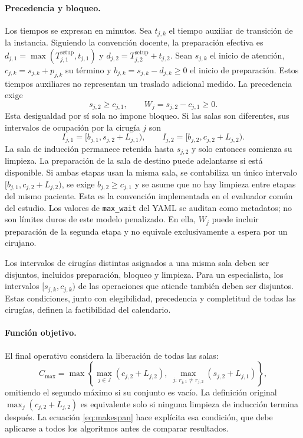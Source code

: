 \documentclass[11pt,a4paper]{article}
\newcommand{\Cmax}{C_{\max}}
\begin{document}
\paragraph{Precedencia y bloqueo.}
Los tiempos se expresan en minutos. Sea $t_{j,k}$ el tiempo auxiliar de transición de la instancia. Siguiendo la convención docente, la preparación efectiva es $d_{j,1}=\max(T^{\mathrm{setup}}_{j,1},t_{j,1})$ y $d_{j,2}=T^{\mathrm{setup}}_{j,2}+t_{j,2}$. Sean $s_{j,k}$ el inicio de atención, $c_{j,k}=s_{j,k}+p_{j,k}$ su término y $b_{j,k}=s_{j,k}-d_{j,k}\geq0$ el inicio de preparación. Estos tiempos auxiliares no representan un traslado adicional medido. La precedencia exige
\begin{equation}
s_{j,2}\geq c_{j,1},\qquad W_j=s_{j,2}-c_{j,1}\geq0.
\label{eq:precedencia}
\end{equation}
Esta desigualdad por sí sola no impone bloqueo. Si las salas son diferentes, sus intervalos de ocupación por la cirugía $j$ son
\begin{equation}
I_{j,1}=[b_{j,1},s_{j,2}+L_{j,1}),\qquad
I_{j,2}=[b_{j,2},c_{j,2}+L_{j,2}).
\label{eq:intervalos}
\end{equation}
La sala de inducción permanece retenida hasta $s_{j,2}$ y solo entonces comienza su limpieza. La preparación de la sala de destino puede adelantarse si está disponible. Si ambas etapas usan la misma sala, se contabiliza un único intervalo $[b_{j,1},c_{j,2}+L_{j,2})$, se exige $b_{j,2}\geq c_{j,1}$ y se asume que no hay limpieza entre etapas del mismo paciente. Esta es la convención implementada en el evaluador común del estudio. Los valores de \texttt{max\_wait} del YAML se auditan como metadatos; no son límites duros de este modelo penalizado. En ella, $W_j$ puede incluir preparación de la segunda etapa y no equivale exclusivamente a espera por un cirujano.

Los intervalos de cirugías distintas asignados a una misma sala deben ser disjuntos, incluidos preparación, bloqueo y limpieza. Para un especialista, los intervalos $[s_{j,k},c_{j,k})$ de las operaciones que atiende también deben ser disjuntos. Estas condiciones, junto con elegibilidad, precedencia y completitud de todas las cirugías, definen la factibilidad del calendario.

\paragraph{Función objetivo.}
El final operativo considera la liberación de todas las salas:
\begin{equation}
\Cmax=\max\left\{\max_{j\in J}(c_{j,2}+L_{j,2}),\;
\max_{j:\,r_{j,1}\ne r_{j,2}}(s_{j,2}+L_{j,1})\right\},
\label{eq:makespan}
\end{equation}
omitiendo el segundo máximo si su conjunto es vacío. La definición original $\max_j(c_{j,2}+L_{j,2})$ es equivalente solo si ninguna limpieza de inducción termina después. La ecuación \eqref{eq:makespan} hace explícita esa condición, que debe aplicarse a todos los algoritmos antes de comparar resultados.
\end{document}
